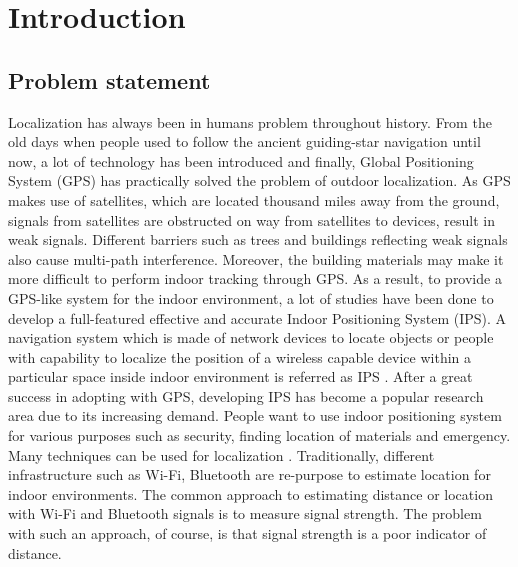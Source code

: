 \documentclass[\main/main.tex]{subfiles}
\begin{document}
\graphicspath{{img/}{01_intro/img/}}

\chapter{Introduction}

\section{Problem statement}
Localization has always been in humans problem throughout history. From the old days when people used to follow the ancient guiding-star navigation until now, a lot of technology has been introduced and finally, Global Positioning System (GPS) has practically solved the problem of outdoor localization. As GPS makes use of satellites, which are located thousand miles away from the ground, signals from satellites are obstructed on way from satellites to devices, result in weak signals. Different barriers such as trees and buildings reflecting weak signals also cause multi-path interference. Moreover, the building materials may make it more difficult to perform indoor tracking through GPS. As a result, to provide a GPS-like system for the indoor environment, a lot of studies have been done to develop a full-featured effective and accurate Indoor Positioning System (IPS).
\newline\newline
A navigation system which is made of network devices to locate objects or people with capability to localize the position of a wireless capable device within a particular space inside indoor environment is referred as IPS \cite{survey_on_indoor_wireless_positioning_techniques}. After a great success in adopting with GPS, developing IPS has become a popular research area due to its increasing demand. People want to use indoor positioning system for various purposes such as security, finding location of materials and emergency. 
\newline\newline
Many techniques can be used for localization \cite{a_survey_on_localization_for_mobile_wireless_sensor_networks}. Traditionally, different infrastructure such as Wi-Fi, Bluetooth are re-purpose to estimate location for indoor environments. The common approach to estimating distance or location with Wi-Fi and Bluetooth signals is to measure signal strength. The problem with such an approach, of course, is that signal strength is a poor indicator of distance.
\newline\newline
\end{document}
